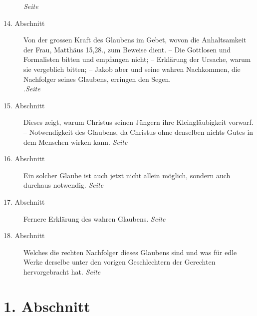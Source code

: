 \begin{description}
\dotfill \textit{Seite~\pageref{kap6_ab13}}\\
\item[14. Abschnitt] Von der grossen Kraft des Glaubens im Gebet, wovon die
Anhaltsamkeit
der Frau, Matthäus 15,28., zum Beweise dient. -- Die Gottlosen
und Formalisten bitten und empfangen nicht; -- Erklärung der Ursache, warum sie
vergeblich bitten; -- Jakob aber und seine wahren Nachkommen, die Nachfolger
seines Glaubens, erringen
den Segen.\\
.\dotfill \textit{Seite~\pageref{kap6_ab14}}\\
\item[15. Abschnitt] Dieses zeigt, warum Christus seinen Jüngern ihre
Kleingläubigkeit vorwarf. -- Notwendigkeit des Glaubens, da Christus ohne
denselben nichts Gutes in dem Menschen wirken kann.
\dotfill \textit{Seite~\pageref{kap6_ab15}}\\
\item[16. Abschnitt] Ein solcher Glaube ist auch jetzt nicht allein möglich,
sondern auch durchaus notwendig.
\dotfill \textit{Seite~\pageref{kap6_ab16}}\\
\item[17. Abschnitt] Fernere Erklärung des wahren Glaubens.
\dotfill \textit{Seite~\pageref{kap6_ab17}}\\
\item[18. Abschnitt] Welches die rechten Nachfolger dieses Glaubens sind und
was für edle Werke derselbe unter den vorigen Geschlechtern der Gerechten
hervorgebracht hat.
\dotfill \textit{Seite~\pageref{kap6_ab18}}\\

\end{description}

\newpage

\section{1. Abschnitt} \label{kap6_ab1}

